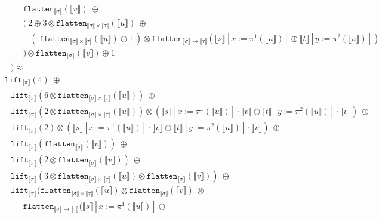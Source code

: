 \documentclass[a4paper,UKenglish,cleveref,autoref,numberwithinsect]{lipics-v2019}
\theoremstyle{definition}
\newcommand{\arrtype}{\rightarrow}
\newcommand{\flatten}{\mathtt{flatten}}
\newcommand{\lift}{\mathtt{lift}}
\newcommand{\typeinterpret}[1]{\llbracket #1 \rrbracket}
\newcommand{\interpret}[1]{\llbracket #1 \rrbracket}
\begin{document}
\begin{itemize}
\[\begin{array}{l}
    \phantom{ABC}\flatten_{\typeinterpret{\sigma}}(\interpret{v})\ 
      \oplus \\
    \phantom{ABC}(\ 2 \oplus 3 \otimes \flatten_{\typeinterpret{\sigma}
      \times \typeinterpret{\tau}}(\interpret{u})\ \oplus \\
    \phantom{ABCD}(\ 
    \flatten_{\typeinterpret{\sigma} \times \typeinterpret{\tau}}(
    \interpret{u}) \oplus 1\ ) \otimes
      \flatten_{\typeinterpret{\sigma} \arrtype
      \typeinterpret{\tau}}(
      \interpret{s}[x:=\pi^1(\interpret{u})] \oplus
       \interpret{t}[y:=\pi^2(\interpret{u})]) \\
    \phantom{ABC} ) \otimes
    \flatten_{\typeinterpret{\sigma}}(\interpret{v}) \oplus 1 \\
    \phantom{A} ) \approx \\
  \lift_{\typeinterpret{\pi}}(4)\ \oplus \\
  \phantom{A}
  \lift_{\typeinterpret{\pi}}(6 \otimes
    \flatten_{\typeinterpret{\sigma} \times \typeinterpret{\tau}}(
    \interpret{u}))\ \oplus \\
  \phantom{A}
  \lift_{\typeinterpret{\pi}}(2 \otimes
    \flatten_{\typeinterpret{\sigma} \times \typeinterpret{\tau}}(
    \interpret{u})) \otimes
    (\interpret{s}[x:=\pi^1(\interpret{u})] \cdot \interpret{v} \oplus
     \interpret{t}[y:=\pi^2(\interpret{u})] \cdot \interpret{v})\ 
     \oplus \\
  \phantom{A}
  \lift_{\typeinterpret{\pi}}(2) \otimes
    (\interpret{s}[x:=\pi^1(\interpret{u})] \cdot \interpret{v} \oplus
     \interpret{t}[y:=\pi^2(\interpret{u})] \cdot \interpret{v})\ 
     \oplus \\
  \phantom{A}
  \lift_{\typeinterpret{\pi}}(\flatten_{\typeinterpret{
    \sigma}}(\interpret{v}))\ \oplus \\
  \phantom{A}
  \lift_{\typeinterpret{\pi}}(2 \otimes \flatten_{\typeinterpret{
    \sigma}}(\interpret{v}))\ \oplus \\
  \phantom{A}
  \lift_{\typeinterpret{\pi}}(3 \otimes \flatten_{\typeinterpret{
    \sigma} \times \typeinterpret{\tau}}(\interpret{u}) \otimes
    \flatten_{\typeinterpret{\sigma}}(\interpret{v}))\ \oplus \\
  \phantom{A}
  \lift_{\typeinterpret{\pi}}(\flatten_{\typeinterpret{\sigma} \times
    \typeinterpret{\tau}}(\interpret{u}) \otimes
    \flatten_{\typeinterpret{\sigma}}(\interpret{v})\ \otimes \\
  \phantom{ABC}
    \flatten_{\typeinterpret{\sigma} \arrtype \typeinterpret{\tau}}(
    \interpret{s}[x:=\pi^1(\interpret{u})] \oplus

\end{array}\]
\end{itemize}
\end{document}
